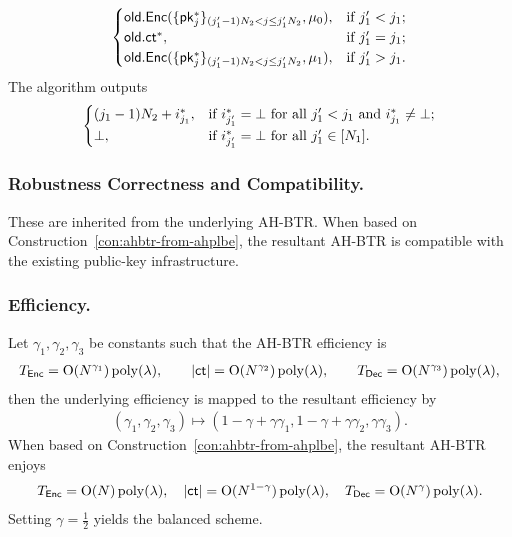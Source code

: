 \begin{construction}
\begin{itemize}
\begin{align*}
\begin{cases}
{\smash{\mathsf{old}}}.{\smash{\mathsf{Enc}}}(\{{\smash{\mathsf{pk}}}^\ast_j\}_{(j_1'-1)N_2<j\leq j_1'N_2},\mu_0),&
\textup{if }j_1'<j_1;\\
{\smash{\mathsf{old}}}.{\smash{\mathsf{ct}}}^\ast,&\textup{if }j_1'=j_1;\\
{\smash{\mathsf{old}}}.{\smash{\mathsf{Enc}}}(\{{\smash{\mathsf{pk}}}^\ast_j\}_{(j_1'-1)N_2<j\leq j_1'N_2},\mu_1),&
\textup{if }j_1'>j_1.
\end{cases}
\end{align*}
The algorithm outputs
\begin{align*}
\begin{cases}
(j_1-1)N_2+i^\ast_{j_1},&\textup{if }
i^\ast_{j_1'}=\bot\textup{ for all }j_1'<j_1
\textup{ and }
i^\ast_{j_1}\neq\bot;\\
\bot,&\textup{if }i^\ast_{j_1'}=\bot\textup{ for all }j_1'\in[N_1].
\end{cases}
\end{align*}
\end{itemize}
\end{construction}

\subsubsection{Robustness Correctness and Compatibility.}
These are inherited from the underlying AH-BTR.
When based on Construction~\ref{con:ahbtr-from-ahplbe},
the resultant AH-BTR is compatible with the existing public-key infrastructure.

\subsubsection{Efficiency.}
Let $\gamma_1,\gamma_2,\gamma_3$ be constants such that the AH-BTR efficiency is
\begin{align*}
T_{\smash{\mathsf{Enc}}}=\operatorname{O}(N^{\gamma_1})\operatorname{poly}(\lambda),\qquad
|{\smash{\mathsf{ct}}}|=\operatorname{O}(N^{\gamma_2})\operatorname{poly}(\lambda),\qquad
T_{\smash{\mathsf{Dec}}}=\operatorname{O}(N^{\gamma_3})\operatorname{poly}(\lambda),
\end{align*}
then the underlying efficiency is mapped to the resultant efficiency by
\begin{align*}
(\gamma_1,\gamma_2,\gamma_3)\mapsto
(1-\gamma+\gamma\gamma_1,1-\gamma+\gamma\gamma_2,\gamma\gamma_3).
\end{align*}
When based on Construction~\ref{con:ahbtr-from-ahplbe},
the resultant AH-BTR enjoys
\begin{align*}
T_{\smash{\mathsf{Enc}}}=\operatorname{O}(N)\operatorname{poly}(\lambda),\quad
|{\smash{\mathsf{ct}}}|=\operatorname{O}(N^{1-\gamma})\operatorname{poly}(\lambda),\quad
T_{\smash{\mathsf{Dec}}}=\operatorname{O}(N^\gamma)\operatorname{poly}(\lambda).
\end{align*}
Setting ${\gamma=\frac12}$ yields the balanced scheme.
